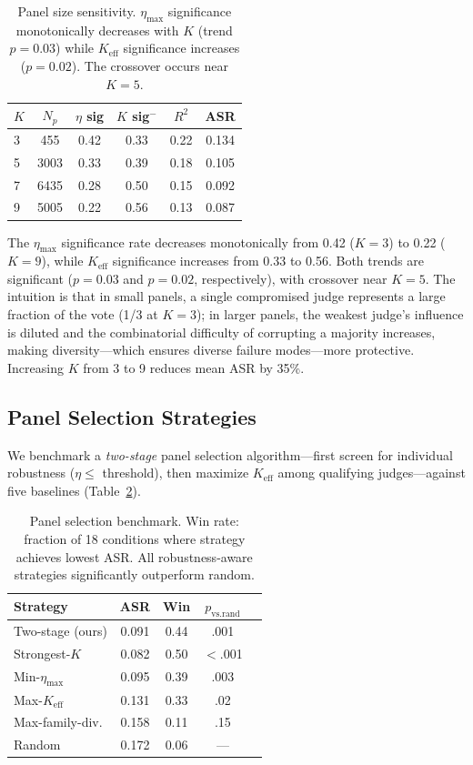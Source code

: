 \documentclass[11pt]{article}
\begin{document}
\begin{table}[t]
\centering
\small
\begin{tabular}{lccccc}
\toprule
$K$ & $N_p$ & $\eta$ sig & $K$ sig$^-$ & $R^2$ & ASR \\
\midrule
3 & 455 & 0.42 & 0.33 & 0.22 & 0.134 \\
5 & 3003 & 0.33 & 0.39 & 0.18 & 0.105 \\
7 & 6435 & 0.28 & 0.50 & 0.15 & 0.092 \\
9 & 5005 & 0.22 & 0.56 & 0.13 & 0.087 \\
\bottomrule
\end{tabular}
\caption{Panel size sensitivity. $\eta_{\max}$ significance monotonically decreases with $K$ (trend $p = 0.03$) while $K_{\text{eff}}$ significance increases ($p = 0.02$). The crossover occurs near $K = 5$.}
\label{tab:panel_size}
\end{table}

The $\eta_{\max}$ significance rate decreases monotonically from 0.42 ($K=3$) to 0.22 ($K=9$), while $K_{\text{eff}}$ significance increases from 0.33 to 0.56.
Both trends are significant ($p = 0.03$ and $p = 0.02$, respectively), with crossover near $K = 5$.
The intuition is that in small panels, a single compromised judge represents a large fraction of the vote (1/3 at $K=3$); in larger panels, the weakest judge's influence is diluted and the combinatorial difficulty of corrupting a majority increases, making diversity---which ensures diverse failure modes---more protective.
Increasing $K$ from 3 to 9 reduces mean ASR by 35\%.

\subsection{Panel Selection Strategies}
\label{sec:panel_selection}

We benchmark a \emph{two-stage} panel selection algorithm---first screen for individual robustness ($\eta \leq$ threshold), then maximize $K_{\text{eff}}$ among qualifying judges---against five baselines (Table~\ref{tab:selection}).

\begin{table}[t]
\centering
\small
\begin{tabular}{lcccc}
\toprule
\textbf{Strategy} & \textbf{ASR} & \textbf{Win} & $p_{\text{vs.rand}}$ \\
\midrule
Two-stage (ours) & 0.091 & 0.44 & .001 \\
Strongest-$K$ & 0.082 & 0.50 & {$<$.001} \\
Min-$\eta_{\max}$ & 0.095 & 0.39 & .003 \\
Max-$K_{\text{eff}}$ & 0.131 & 0.33 & .02 \\
Max-family-div. & 0.158 & 0.11 & .15 \\
Random & 0.172 & 0.06 & --- \\
\bottomrule
\end{tabular}
\caption{Panel selection benchmark. Win rate: fraction of 18 conditions where strategy achieves lowest ASR. All robustness-aware strategies significantly outperform random.}
\label{tab:selection}
\end{table}
\end{document}

